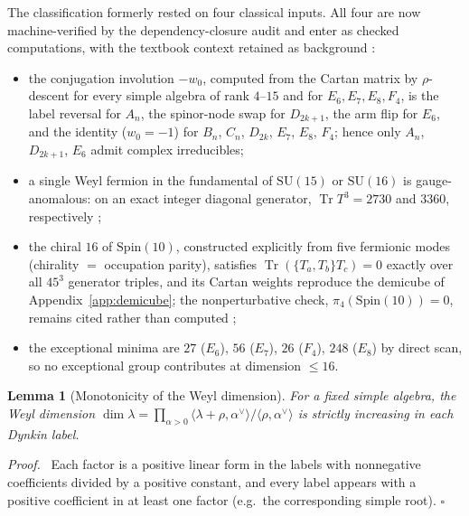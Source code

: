 \documentclass[
  aps,
  prd,
  preprint,
  nofootinbib,
  superscriptaddress,
  longbibliography
]{revtex4-2}
\newcommand{\Spin}{\mathrm{Spin}}
\newcommand{\SU}{\mathrm{SU}}
\DeclareMathOperator{\Tr}{Tr}
\newtheorem{lemma}[theorem]{Lemma}
\newenvironment{proof}{\par\noindent\textit{Proof.}\ }{\hfill\(\square\)\par}
\begin{document}
The classification formerly rested on four classical inputs.  All four are
now machine-verified by the dependency-closure audit and enter as checked
computations, with the textbook context retained as background
\cite{Slansky1981,Georgi1975,FultonHarris1991,GeorgiGlashow1972,Okubo1977}:
\begin{itemize}
\item[(i)] the conjugation involution \(-w_0\), computed from the Cartan
  matrix by \(\rho\)-descent for every simple algebra of rank \(4\)--\(15\)
  and for \(E_6,E_7,E_8,F_4\), is the label reversal for \(A_n\), the
  spinor-node swap for \(D_{2k+1}\), the arm flip for \(E_6\), and the
  identity (\(w_0=-1\)) for \(B_n\), \(C_n\), \(D_{2k}\), \(E_7\), \(E_8\),
  \(F_4\); hence only \(A_n\), \(D_{2k+1}\), \(E_6\) admit complex
  irreducibles;
\item[(ii)] a single Weyl fermion in the fundamental of \(\SU(15)\) or
  \(\SU(16)\) is gauge-anomalous: on an exact integer diagonal generator,
  \(\Tr T^3=2730\) and \(3360\), respectively
  \cite{GeorgiGlashow1972,Okubo1977};
\item[(iii)] the chiral \(16\) of \(\Spin(10)\), constructed explicitly
  from five fermionic modes (chirality \(=\) occupation parity), satisfies
  \(\Tr(\{T_a,T_b\}T_c)=0\) exactly over all \(45^3\) generator triples,
  and its Cartan weights reproduce the demicube of
  Appendix~\ref{app:demicube}; the nonperturbative check,
  \(\pi_4(\Spin(10))=0\), remains cited rather than computed
  \cite{WittenSU2Anomaly1982};
\item[(iv)] the exceptional minima are \(27\) (\(E_6\)), \(56\) (\(E_7\)),
  \(26\) (\(F_4\)), \(248\) (\(E_8\)) by direct scan, so no exceptional
  group contributes at dimension \(\le16\).
\end{itemize}

\begin{lemma}[Monotonicity of the Weyl dimension]
\label{lem:monotone}
For a fixed simple algebra, the Weyl dimension
\(\dim\lambda=\prod_{\alpha>0}\langle\lambda+\rho,\alpha^\vee\rangle/
\langle\rho,\alpha^\vee\rangle\)
is strictly increasing in each Dynkin label.
\end{lemma}

\begin{proof}
Each factor is a positive linear form in the labels with nonnegative
coefficients divided by a positive constant, and every label appears with a
positive coefficient in at least one factor (e.g.\ the corresponding simple
root).
\end{proof}
\end{document}
